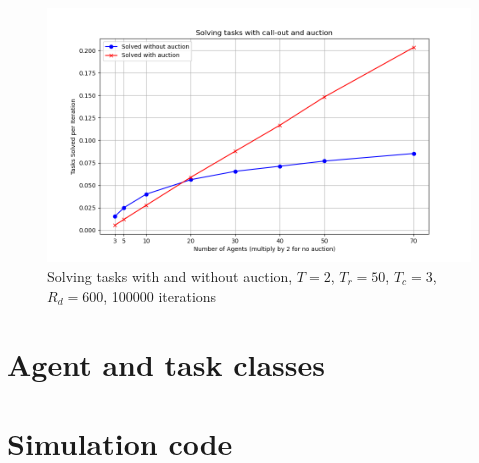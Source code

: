 \documentclass{article}
\begin{document}
\begin{figure}
	\includegraphics[width=\textwidth]{search_ranges_comparison2.png}
	\caption{Solving tasks with and without auction, $T=2$, $T_r=50$, $T_c=3$, $R_d = 600$, 100000 iterations}
	\label{fig:comparison2}
\end{figure}

\appendix

\section{Agent and task classes}



\section{Simulation code}

\end{document}

